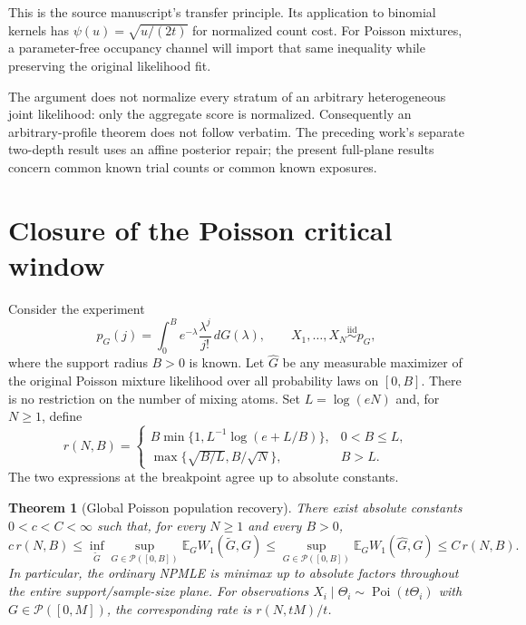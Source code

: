 \documentclass[11pt,a4paper]{article}
\newtheorem{theorem}{Theorem}[section]
\theoremstyle{definition}
\theoremstyle{remark}
\numberwithin{equation}{section}
\begin{document}
This is the source manuscript's transfer principle. Its application to
binomial kernels has $\psi(u)=\sqrt{u/(2t)}$ for normalized count cost.
For Poisson mixtures, a parameter-free occupancy channel will import
that same inequality while preserving the original likelihood fit.

The argument does not normalize every stratum of an arbitrary
heterogeneous joint likelihood: only the aggregate score is normalized.
Consequently an arbitrary-profile theorem does not follow verbatim.
The preceding work's separate two-depth result uses an affine posterior
repair; the present full-plane results concern common known trial counts
or common known exposures.



\clearpage

\section{Closure of the Poisson critical window}
\label{p8:pc:sec}

Consider the experiment
\[
 p_G(j)=\int_0^B e^{-\lambda}\frac{\lambda^j}{j!}\,dG(\lambda),
 \qquad X_1,\ldots,X_N\overset{\mathrm{iid}}\sim p_G,
\]
where the support radius $B>0$ is known.  Let $\widehat G$ be any
measurable maximizer of the original Poisson mixture likelihood over
all probability laws on $[0,B]$.  There is no restriction on the
number of mixing atoms.  Set $L=\log(eN)$ and, for $N\ge1$, define
\begin{equation}\label{p8:pc:rate}
 r(N,B)=
 \begin{cases}
 B\min\{1,L^{-1}\log(e+L/B)\},&0<B\le L,\\[2mm]
 \max\{\sqrt{B/L},B/\sqrt N\},&B>L.
 \end{cases}
\end{equation}
The two expressions at the breakpoint agree up to absolute constants.

\begin{theorem}[Global Poisson population recovery]\label{p8:pc:main}
There exist absolute constants $0<c<C<\infty$ such that, for every
$N\ge1$ and every $B>0$,
\[
 c\,r(N,B)\le
 \inf_{\widetilde G}\sup_{G\in\mathcal P([0,B])}
       \mathbb E_G W_1(\widetilde G,G)
 \le \sup_{G\in\mathcal P([0,B])}
       \mathbb E_G W_1(\widehat G,G)
 \le C\,r(N,B).
\]
In particular, the ordinary NPMLE is minimax up to absolute factors
throughout the entire support/sample-size plane.  For observations
$X_i\mid\Theta_i\sim\operatorname{Poi}(t\Theta_i)$ with
$G\in\mathcal P([0,M])$, the corresponding rate is $r(N,tM)/t$.
\end{theorem}
\end{document}
